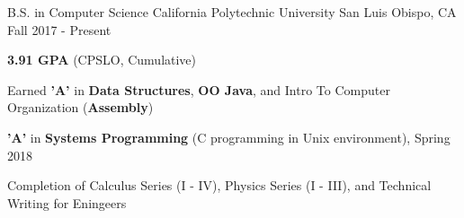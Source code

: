 

\begin{cventries}

  \cventry
    {B.S. in Computer Science} %
    {California Polytechnic University} %
    {San Luis Obispo, CA} %
    {Fall 2017 - Present} %
    {
      \begin{cvitems} %
        \item {\textbf{3.91 GPA} (CPSLO, Cumulative)}
        \item {Earned \textbf{'A'} in \textbf{Data Structures}, \textbf{OO Java}, and Intro To Computer Organization (\textbf{Assembly})}
        \item {\textbf{'A'} in \textbf{Systems Programming} (C programming in Unix environment), Spring 2018}
        \item {Completion of Calculus Series (I - IV), Physics Series (I - III), and Technical Writing for Eningeers}
      \end{cvitems}
    }

\end{cventries}
